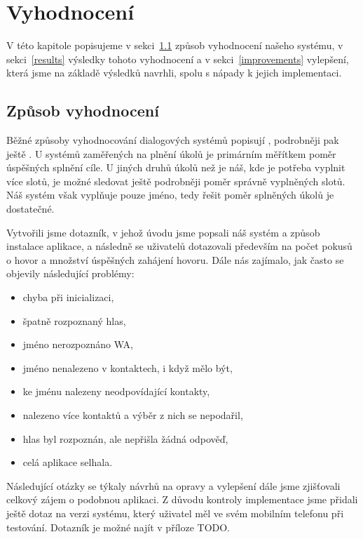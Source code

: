 \chapter{Vyhodnocení}\label{chapter-results}

V této kapitole popisujeme v sekci~\ref{methods} způsob vyhodnocení našeho systému,
v sekci~\ref{results} výsledky tohoto vyhodnocení a v sekci~\ref{improvements}
vylepšení, která jsme na základě výsledků navrhli, spolu s nápady k jejich implementaci.

\section{Způsob vyhodnocení}\label{methods}

Běžné způsoby vyhodnocování dialogových systémů popisují
\citet[sekce 24.5]{jurafsky_slp_2020}, podrobněji pak ještě \citet{Deriu_2020}.
U systémů zaměřených na plnění úkolů je primárním měřítkem poměr úspěšných
splnění cíle. U jiných druhů úkolů než je náš, kde je potřeba vyplnit více slotů, je možné
sledovat ještě podrobněji poměr správně vyplněných slotů. Náš systém však
vyplňuje pouze jméno, tedy řešit poměr splněných úkolů je dostatečné.

Vytvořili jsme dotazník, v jehož úvodu jsme popsali náš systém a způsob instalace
aplikace, a následně se uživatelů dotazovali především na počet pokusů o hovor a
množství úspěšných zahájení hovoru. Dále nás zajímalo, jak často se objevily
následující problémy:
\begin{itemize}
    \item chyba při inicializaci,
    \item špatně rozpoznaný hlas,
    \item jméno nerozpoznáno WA,
    \item jméno nenalezeno v kontaktech, i když mělo být,
    \item ke jménu nalezeny neodpovídající kontakty,
    \item nalezeno více kontaktů a výběr z nich se nepodařil,
    \item hlas byl rozpoznán, ale nepřišla žádná odpověď,
    \item celá aplikace selhala.
\end{itemize}
Následující otázky se týkaly návrhů na opravy a vylepšení dále jsme zjišťovali celkový
zájem o podobnou aplikaci. Z důvodu kontroly implementace jsme přidali ještě
dotaz na verzi systému, který uživatel měl ve svém mobilním telefonu při testování. Dotazník je
možné najít v příloze TODO.

